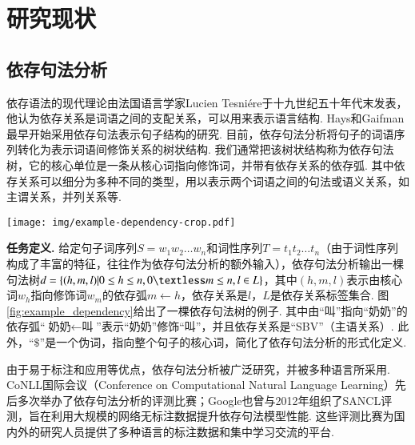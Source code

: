 
\section{研究现状}

\subsection{依存句法分析}
依存语法的现代理论由法国语言学家Lucien Tesni\'{e}re于十九世纪五十年代末发表，他认为依存关系是词语之间的支配关系，可以用来表示语言结构.
Hays和Gaifman 最早开始采用依存句法表示句子结构的研究. 目前，依存句法分析将句子的词语序列转化为表示词语间修饰关系的树状结构. 我们通常把该树状结构称为依存句法树，它的核心单位是一条从核心词指向修饰词，并带有依存关系的依存弧. 其中依存关系可以细分为多种不同的类型，用以表示两个词语之间的句法或语义关系，如主谓关系，并列关系等.

\begin{figure*}[hb!]
    \centering
    \texttt{[image: img/example-dependency-crop.pdf]}
    \caption{依存句法树示例. }
    \label{fig:example_dependency}
\end{figure*}
\textbf{任务定义.  }给定句子词序列$S=w_1w_2\dots w_n$和词性序列$T=t_1t_2\dots t_n$（由于词性序列构成了丰富的特征，往往作为依存句法分析的额外输入），依存句法分析输出一棵句法树$d=\{(h,m,l)|0 \leq h \leq n, 0 \textless m \leq n, l \in L\}$，其中$(h,m,l)$表示由核心词$w_h$指向修饰词$w_m$的依存弧$m \leftarrow h$，依存关系是$l$，$L$是依存关系标签集合. 图\ref{fig:example_dependency}给出了一棵依存句法树的例子. 其中由“叫”指向“奶奶”的依存弧“$\mbox{奶奶} \leftarrow \mbox{叫}$”表示“奶奶”修饰“叫”，并且依存关系是“SBV”（主语关系）. 此外，“$\$$”是一个伪词，指向整个句子的核心词，简化了依存句法分析的形式化定义.

由于易于标注和应用等优点，依存句法分析被广泛研究，并被多种语言所采用. CoNLL国际会议（Conference on Computational Natural Language Learning）先后多次举办了依存句法分析的评测比赛；Google也曾与2012年组织了SANCL评测，旨在利用大规模的网络无标注数据提升依存句法模型性能. 这些评测比赛为国内外的研究人员提供了多种语言的标注数据和集中学习交流的平台.

